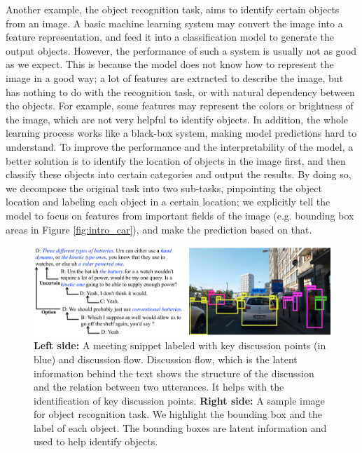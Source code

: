 Another example, the object recognition task, aims to identify certain objects from an image. A basic machine learning system may convert the image into a feature representation, and feed it into a classification model to generate the output objects. However, the performance of such a system is usually not as good as we expect. This is because the model does not know how to represent the image in a good way; a lot of features are extracted to describe the image, but has nothing to do with the recognition task, or with natural dependency between the objects. For example, some features may represent the colors or brightness of the image, which are not very helpful to identify objects. In addition, the whole learning process works like a black-box system, making model predictions hard to understand. To improve the performance and the interpretability of the model, a better solution is to identify the location of objects in the image first, and then classify these objects into certain categories and output the results. By doing so, we decompose the original task into two sub-tasks, pinpointing the object location and labeling each object in a certain location; we explicitly tell the model to focus on features from important fields of the image (e.g. bounding box areas in Figure \ref{fig:intro_car}), and make the prediction based on that. 

\begin{figure}[t] 
\centering
\includegraphics[width=1.0\columnwidth]{Images/intro_txt_car2.png} 
  \caption{\textbf{Left side:} A meeting snippet labeled with key discussion points (in blue) and discussion flow. Discussion flow, which is the latent information behind the text shows the structure of the discussion and the relation between two utterances. It helps with the identification of key discussion points. \textbf{Right side:} A sample image for object recognition task. We highlight the bounding box and the label of each object. The bounding boxes are latent information and used to help identify objects.}
\end{figure}\label{fig:intro_car} 


